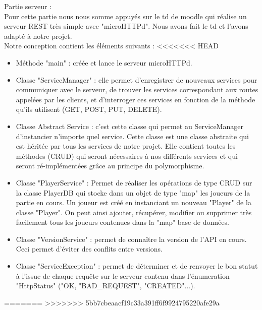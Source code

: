 \documentclass[12pt,a4paper]{article}
\begin{document}
\newpage
Partie serveur : \\
Pour cette partie nous nous somme appuyés sur le td de moodle qui réalise un serveur REST très simple avec "microHTTPd". Nous avons fait le td et l'avons adapté à notre projet. \\Notre conception contient les éléments suivants : 
<<<<<<< HEAD

\begin{itemize}
    \item Méthode "main" : créée et lance le serveur microHTTPd.
    \item Classe "ServiceManager" : elle permet d'enregistrer de nouveaux services pour communiquer avec le serveur, de trouver les services correspondant aux routes appelées par les clients, et d'interroger ces services en fonction de la méthode qu'ils utilisent (GET, POST, PUT, DELETE).
    \item Classe Abstract Service : c'est cette classe qui permet au ServiceManager d'instancier n'importe quel service. Cette classe est une classe abstraite qui est héritée par tous les services de notre projet. Elle contient toutes les méthodes (CRUD) qui seront nécessaires à nos différents services et qui seront ré-implémentées grâce au principe du polymorphisme.  
    \item Classe "PlayerService" : Permet de réaliser les opérations de type CRUD sur la classe PlayerDB qui stocke dans un objet de type "map" les joueurs de la partie en cours. Un joueur est créé en instanciant un nouveau "Player" de la classe "Player". On peut ainsi ajouter, récupérer, modifier ou supprimer très facilement tous les joueurs contenues dans la "map" base de données.
    \item Classe "VersionService" : permet de connaître la version de l'API en cours. Ceci permet d'éviter des conflits entre versions. 
    \item Classe "ServiceException" : permet de déterminer et de renvoyer le bon statut à l'issue de chaque requête sur le serveur contenu dans l'énumeration "HttpStatus" ("OK, "BAD\_REQUEST", "CREATED"...).
\end{itemize}
=======
>>>>>>> 5bb7cbeaacf19c33a391ff6f9924795220afe29a
\end{document}
